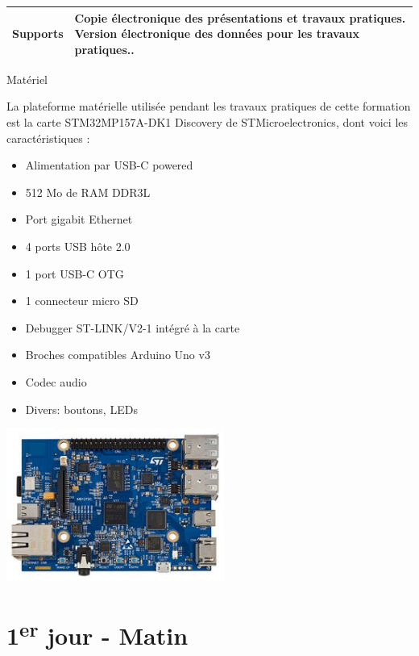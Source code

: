 \documentclass[a4paper,12pt,obeyspaces,spaces,hyphens]{article}
\begin{document}
{\begin{tabularx}{\textwidth}{|g|h|}
    {\bf Supports} & Copie électronique des présentations et travaux pratiques.
    \newline Version électronique des données pour les travaux
    pratiques..\\
    \hline

\end{tabularx}}
\normalsize

\feagendatwocolumn
{Matériel}
{
  La plateforme matérielle utilisée pendant les travaux pratiques de
  cette formation est la carte {STM32MP157A-DK1 Discovery de STMicroelectronics}, dont voici les
  caractéristiques :

  \begin{itemize}
  \item Alimentation par USB-C powered
  \item 512 Mo de RAM DDR3L
  \item Port gigabit Ethernet
  \item 4 ports USB hôte 2.0
  \item 1 port USB-C OTG
  \item 1 connecteur micro SD
  \item Debugger ST-LINK/V2-1 intégré à la carte
  \item Broches compatibles Arduino Uno v3
  \item Codec audio
  \item Divers: boutons, LEDs
  \end{itemize}
}
{}
{
  \begin{center}
    \includegraphics[height=5cm]{../slides/discovery-board/discovery-board.jpg}
  \end{center}
}

\section{1\textsuperscript{er} jour - Matin}
\end{document}
